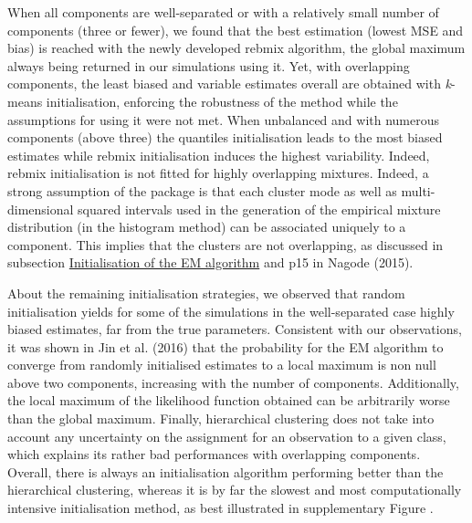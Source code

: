 When all components are well-separated or with a relatively small number of components (three or fewer), we found that the best
estimation (lowest MSE and bias) is reached with the newly developed
rebmix algorithm, the global maximum always being returned in our
simulations using it. Yet, with overlapping components, the least biased
and variable estimates overall are obtained with \emph{k}-means
initialisation, enforcing the robustness of the method while the
assumptions for using it were not met. When unbalanced and with numerous components (above three) the quantiles initialisation leads to the most biased estimates while rebmix initialisation induces the highest variability. Indeed, rebmix
initialisation is not fitted for highly overlapping mixtures. Indeed, a strong assumption of the package is that each cluster mode as well as multi-dimensional squared intervals used in the generation of the empirical mixture distribution (in the histogram method) can be associated uniquely to a component. This implies that the clusters are not overlapping, as discussed in subsection \protect\hyperlink{initialisation-of-the-em-algorithm}{Initialisation of the EM algorithm} and p15 in Nagode (2015).

About the remaining initialisation strategies, we observed that random initialisation yields for some of the simulations in the well-separated case highly biased estimates, far from the true
parameters. Consistent with our observations, it was shown in
Jin et al. (2016) that the probability for the EM algorithm to converge from
randomly initialised estimates to a local maximum is non null above two
components, increasing with the number of components. Additionally, the
local maximum of the likelihood function obtained can be arbitrarily
worse than the global maximum. Finally, hierarchical clustering does not
take into account any uncertainty on the assignment for an observation
to a given class, which explains its rather bad performances with
overlapping components. Overall, there is always an initialisation
algorithm performing better than the hierarchical clustering, whereas it
is by far the slowest and most computationally intensive initialisation
method, as best illustrated in supplementary Figure .


